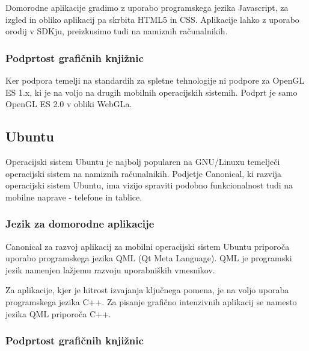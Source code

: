 Domorodne aplikacije gradimo z uporabo programskega jezika Javascript, za izgled in obliko aplikacij pa skrbita HTML5 in CSS. Aplikacije lahko z uporabo orodij v SDKju, preizkusimo tudi na namiznih računalnikih.

\subsubsection{Podprtost grafičnih knjižnic}

Ker podpora temelji na standardih za spletne tehnologije ni podpore za OpenGL ES 1.x, ki je na voljo na drugih mobilnih operacijskih sistemih. Podprt je samo OpenGL ES 2.0 v obliki WebGLa.

\subsection{Ubuntu}

Operacijski sistem Ubuntu \cite{ubuntu} je najbolj popularen na GNU/Linuxu temelječi operacijski sistem na namiznih računalnikih. Podjetje Canonical, ki razvija operacijski sistem Ubuntu, ima vizijo spraviti podobno funkcionalnost tudi na mobilne naprave - telefone in tablice. %


\subsubsection{Jezik za domorodne aplikacije}

Canonical za razvoj aplikacij za mobilni operacijski sistem Ubuntu priporoča uporabo programskega jezika QML (Qt Meta Language). QML je programski jezik namenjen lažjemu razvoju uporabniških vmesnikov. 

Za aplikacije, kjer je hitrost izvajanja ključnega pomena, je na voljo uporaba programskega jezika C++. Za pisanje grafično intenzivnih aplikacij se namesto jezika QML priporoča C++.

\subsubsection{Podprtost grafičnih knjižnic}

